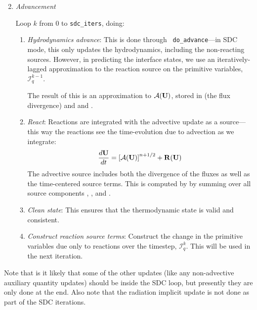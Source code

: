 \begin{enumerate}
\setcounter{enumi}{1}

\item {\em Advancement}

  Loop $k$ from 0 to {\tt sdc\_iters}, doing:

  \begin{enumerate}
    \item {\em Hydrodynamics advance}: This is done through {\tt
      do\_advance}---in SDC mode, this only updates the hydrodynamics,
      including the non-reacting sources.  However, in predicting the
      interface states, we use an iteratively-lagged approximation to the 
      reaction source on the primitive variables, $\mathcal{I}_q^{k-1}$.  

      The result of this is an approximation to $\mathcal{A}({\bf U})$,
      stored in  (the flux divergence)
      and  and .

    \item {\em React}: Reactions are integrated with the advective
      update as a source---this way the reactions see the
      time-evolution due to advection as we integrate:
      \begin{equation}
        \frac{d{\bf U}}{dt} = \left [ \mathcal{A}({\bf U}) \right ]^{n+1/2} + {\bf R}({\bf U})
      \end{equation}
     The advective source includes both the divergence of the fluxes
      as well as the time-centered source terms.  This is computed by
       by summing over all source components
      , , and
      .  

    \item {\em Clean state}: This ensures that the thermodynamic state is
      valid and consistent.

    \item {\em Construct reaction source terms}: Construct the change
      in the primitive variables due only to reactions over the
      timestep, $\mathcal{I}_q^{k}$.  This will be used in the next
      iteration.
  \end{enumerate}


\end{enumerate}


Note that is it likely that some of the other updates (like any
non-advective auxiliary quantity updates) should be inside the SDC
loop, but presently they are only done at the end.  Also note that the
radiation implicit update is not done as part of the SDC iterations.


